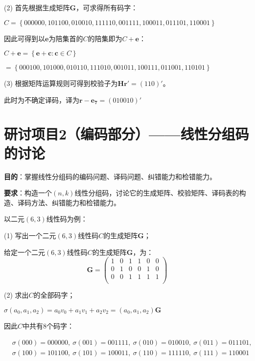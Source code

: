 \begin{Solution}
    (2) 首先根据生成矩阵$\bm{G}$，可求得所有码字：
    
    $C=\left\{000000, 101100, 010010, 111110, 001111, 100011, 011101, 110001\right\}$

    因此可得到以$\bm{e}$为陪集首的$C$的陪集即为$C+\bm{e}$：

    $C+\bm{e} = \left\{\bm{e}+\bm{c}:\bm{c}\in C\right\}$

    $= \left\{ 000100, 101000, 010110, 111010, 001011, 100111, 011001, 110101\right\}$

    \vspace{8pt}

    (3) 根据矩阵运算规则可得到校验子为$\bm{Hr}' = (110)'$。
    
    此时为不确定译码，译为$\bm{r}-\bm{e_7} = (010010)'$
\end{Solution}

\newpage
\chapter{研讨项目2（编码部分）——线性分组码的讨论}

\textbf{目的}：掌握线性分组码的编码问题、译码问题、纠错能力和检错能力。

\textbf{要求}：构造一个$(n,k)$线性分组码，讨论它的生成矩阵、校验矩阵、译码表的构造、译码方法、纠错能力和检错能力。


以二元$(6,3)$线性码为例：

(1) 写出一个二元$(6,3)$线性码$C$的生成矩阵$\bm{G}$；

\begin{Solution}
给定一个二元$(6,3)$线性码$C$的生成矩阵$\bm{G}$，为：
    \begin{equation}
        \bm{G} =
        \left(
            \begin{matrix}
                1 &0 &1 &1 &0 &0\\
                0 &1 &0 &0 &1 &0\\
                0 &0 &1 &1 &1 &1\\
            \end{matrix}
        \right)
    \end{equation}
\end{Solution}

(2) 求出$C$的全部码字；

\begin{Solution}
$\sigma(a_0,a_1,a_2) = a_0v_0 + a_1v_1 + a_2v_2 = (a_0,a_1,a_2)\bm{G}$
        
        因此$C$中共有$8$个码字：
    
        $
        \begin{aligned}
            &\sigma(000) = 000000,~
            \sigma(001) = 001111,~
            \sigma(010) = 010010,~
            \sigma(011) = 011101,\\
            &\sigma(100) = 101100,~
            \sigma(101) = 100011,~
            \sigma(110) = 111110,~
            \sigma(111) = 110001\\
        \end{aligned}
        $\\
    \end{Solution}

